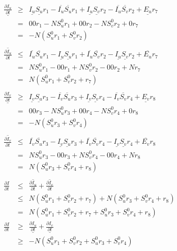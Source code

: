 \begin{eqnarray*}
    \underline{\frac{\partial I_u}{\partial t}} &\geq&   \underline{I_u} \underline{S_u} r_1 - \overline{I_u} \overline{S_u} r_1 + \underline{I_u} \underline{S_v} r_2 - \overline{I_u} \overline{S_v} r_2 + \underline{E_u} r_7\\
    &=&  0 0 r_1 - N S_u^0 r_1 + 0 0 r_2 - N S_v^0 r_2 + 0 r_7\\
    &=&  - N (S_u^0 r_1 + S_v^0 r_2)\\
    \\
    \overline{\frac{\partial I_u}{\partial t}} &\leq& \overline{I_u} \overline{S_u} r_1 - \underline{I_u} \underline{S_u} r_1 + \overline{I_u} \overline{S_v} r_2 - \underline{I_u} \underline{S_v} r_2 + \overline{E_u} r_7\\
    &=&  N S_u^0 r_1 - 0 0 r_1 + N S_v^0 r_2 - 0 0 r_2 + N r_7\\
    &=&  N (S_u^0 r_1 + S_v^0 r_2 + r_7)\\
    \\
    \underline{\frac{\partial I_v}{\partial t}} &\geq&  \underline{I_v} \underline{S_u} r_3 - \overline{I_v} \overline{S_u} r_3 + \underline{I_v} \underline{S_v} r_4 - \overline{I_v} \overline{S_v} r_4 + \underline{E_v} r_8\\
    &=&  0 0 r_3 - N S_u^0 r_3 + 0 0  r_4 - N S_v^0 r_4 + 0 r_8\\
    &=&  - N (S_u^0 r_3 + S_v^0 r_4)\\
    \\
    \overline{\frac{\partial I_v}{\partial t}} &\leq&  \overline{I_v} \overline{S_u} r_3 - \underline{I_v} \underline{S_u} r_3 + \overline{I_v} \overline{S_v} r_4 - \underline{I_v} \underline{S_v} r_4 + \overline{E_v} r_8\\
    &=&  N S_u^0 r_3 - 0 0 r_3 + N S_v^0 r_4 - 0 0 r_4 + N r_8\\
    &=&  N (S_u^0 r_3 + S_v^0 r_4 + r_8)\\
    \\
    \frac{\partial I}{\partial t} &\leq& \overline{\frac{\partial I_u}{\partial t}}  + \overline{\frac{\partial I_v}{\partial t}}\\
    &\leq& N (S_u^0 r_1 + S_v^0 r_2 + r_7) + N (S_u^0 r_3 + S_v^0 r_4 + r_8)\\
    &=& N (S_u^0 r_1 + S_v^0 r_2 + r_7 + S_u^0 r_3 + S_v^0 r_4 + r_8)\\
    \frac{\partial I}{\partial t} &\geq& \underline{\frac{\partial I_u}{\partial t}}  + \underline{\frac{\partial I_v}{\partial t}}\\
    &\geq& - N (S_u^0 r_1 + S_v^0 r_2 + S_u^0 r_3 + S_v^0 r_4)
    \\
\end{eqnarray*}

